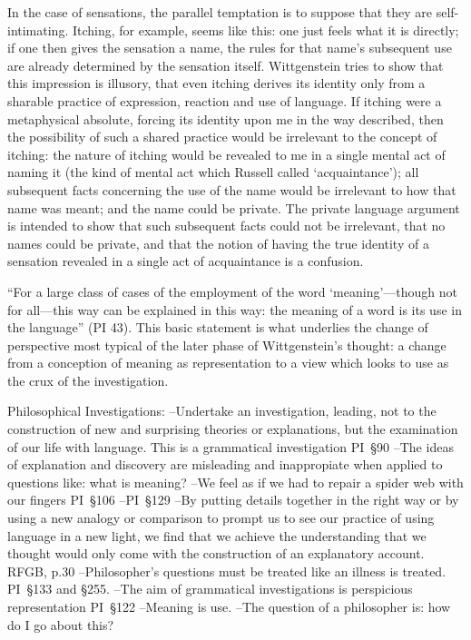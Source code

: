 In the case of sensations, the parallel temptation is to suppose that they are
self-intimating. Itching, for example, seems like this: one just feels what it
is directly; if one then gives the sensation a name, the rules for that name's
subsequent use are already determined by the sensation itself. Wittgenstein
tries to show that this impression is illusory, that even itching derives its
identity only from a sharable practice of expression, reaction and use of
language. If itching were a metaphysical absolute, forcing its identity upon me
in the way described, then the possibility of such a shared practice would be
irrelevant to the concept of itching: the nature of itching would be revealed to
me in a single mental act of naming it (the kind of mental act which Russell
called ‘acquaintance’); all subsequent facts concerning the use of the name
would be irrelevant to how that name was meant; and the name could be private.
The private language argument is intended to show that such subsequent facts
could not be irrelevant, that no names could be private, and that the notion of
having the true identity of a sensation revealed in a single act of acquaintance
is a confusion.

\begin{revision}
  ``For a large class of cases of the employment of the word ‘meaning’—though
  not for all—this way can be explained in this way: the meaning of a word is
  its use in the language'' (PI 43). This basic statement is what underlies the
  change of perspective most typical of the later phase of Wittgenstein's
  thought: a change from a conception of meaning as representation to a view
  which looks to use as the crux of the investigation.
\end{revision}

\begin{revision}
  Philosophical Investigations: --Undertake an investigation, leading, not to
  the construction of new and surprising theories or explanations, but the
  examination of our life with language. This is a grammatical investigation
  PI~\S90 --The ideas of explanation and discovery are misleading and
  inappropiate when applied to questions like: what is meaning? --We feel as if
  we had to repair a spider web with our fingers PI~\S106 --PI~\S129 --By
  putting details together in the right way or by using a new analogy or
  comparison to prompt us to see our practice of using language in a new light,
  we find that we achieve the understanding that we thought would only come with
  the construction of an explanatory account. RFGB, p.30 --Philosopher's
  questions must be treated like an illness is treated. PI~\S133 and \S255.
  --The aim of grammatical investigations is perspicious representation PI~\S122
  --Meaning is use. --The question of a philosopher is: how do I go about this?
  \end{revision}


